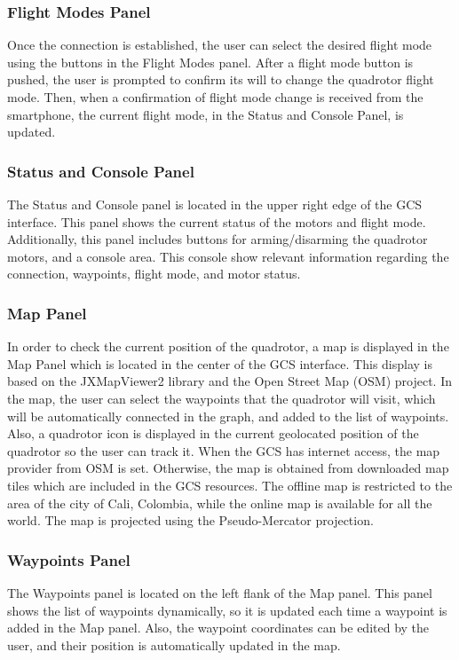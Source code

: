 \subsubsection*{Flight Modes Panel}
Once the connection is established, the user can select the desired flight mode using the buttons in the Flight Modes panel. After a flight mode button is pushed, the user is prompted to confirm its will to change the quadrotor flight mode. Then, when a confirmation of flight mode change is received from the smartphone, the current flight mode, in the Status and Console Panel, is updated.
\subsubsection*{Status and Console Panel}
The Status and Console panel is located in the upper right edge of the GCS interface. This panel shows the current status of the motors and flight mode. Additionally, this panel includes buttons for arming/disarming the quadrotor motors, and a console area. This console show relevant information regarding the connection, waypoints, flight mode, and motor status.
\subsubsection*{Map Panel}
In order to check the current position of the quadrotor, a map is displayed in the Map Panel which is located in the center of the GCS interface. This display is based on the JXMapViewer2 library and the Open Street Map (OSM) project. In the map, the user can select the waypoints that the quadrotor will visit, which will be automatically connected in the graph, and added to the list of waypoints. Also, a quadrotor icon is displayed in the current geolocated position of the quadrotor so the user can track it. When the GCS has internet access, the map provider from OSM is set. Otherwise, the map is obtained from downloaded map tiles which are included in the GCS resources. The offline map is restricted to the area of the city of Cali, Colombia, while the online map is available for all the world. The map is projected using the Pseudo-Mercator projection.
\subsubsection*{Waypoints Panel}
The Waypoints panel is located on the left flank of the Map panel. This panel shows the list of waypoints dynamically, so it is updated each time a waypoint is added in the Map panel. Also, the waypoint coordinates can be edited by the user, and their position is automatically updated in the map.
